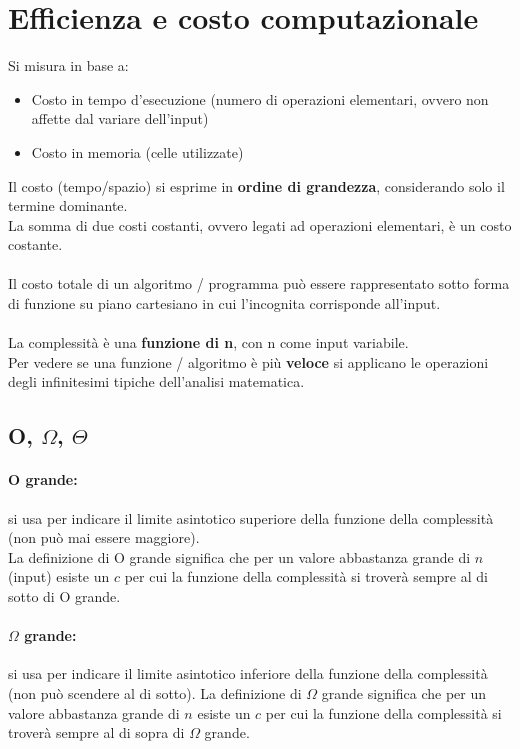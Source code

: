 \documentclass[a4paper,12pt]{article}
\let\oldsection\section
\renewcommand{\section}{\clearpage\oldsection}
\begin{document}
\section{Efficienza e costo computazionale}

Si misura in base a:
\begin{itemize}
  \item Costo in tempo d’esecuzione (numero di operazioni elementari, ovvero non affette dal variare dell'input)
  \item Costo in memoria (celle utilizzate)
\end{itemize}
Il costo (tempo/spazio) si esprime in \textbf{ordine di grandezza}, considerando solo il termine dominante.\\
La somma di due costi costanti, ovvero legati ad operazioni elementari, è un costo costante.\\\\
Il costo totale di un algoritmo / programma può essere rappresentato sotto forma di funzione su piano cartesiano in cui l'incognita corrisponde all'input.\\\\
La complessità è una \textbf{funzione di n}, con n come input variabile.\\
Per vedere se una funzione / algoritmo è più \textbf{veloce} si applicano le operazioni degli infinitesimi tipiche dell'analisi matematica.
\subsection{O, $\Omega$, $\Theta$}
\paragraph{O grande: } si usa per indicare il limite asintotico superiore della funzione della complessità (non può mai essere maggiore).\\
La definizione di O grande significa che per un valore abbastanza grande di $n$ (input) esiste un $c$ per cui la funzione della complessità si troverà sempre al di sotto di O grande.
\paragraph{$\Omega$ grande: } si usa per indicare il limite asintotico inferiore della funzione della complessità (non può scendere al di sotto).
La definizione di $\Omega$ grande significa che per un valore abbastanza grande di $n$ esiste un $c$ per cui la funzione della complessità si troverà sempre al di sopra di $\Omega$ grande. 
\end{document}
